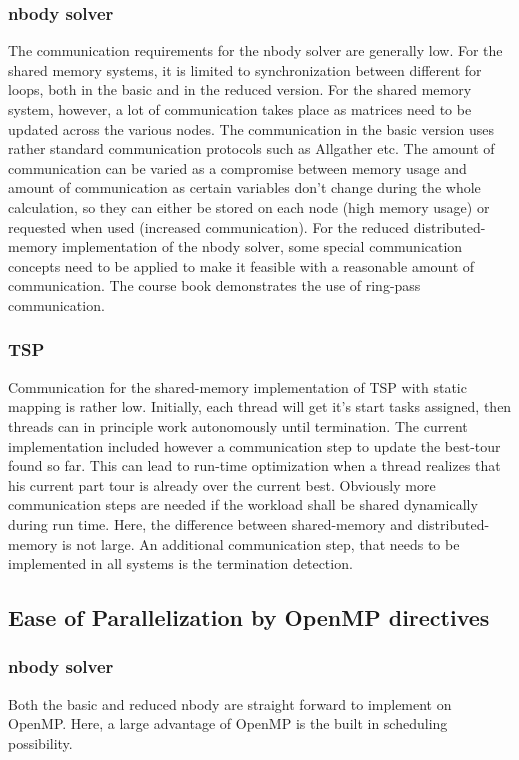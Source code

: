 \documentclass[a4paper,11pt,twoside]{article}
\begin{document}
\subsubsection{nbody solver}
The communication requirements for the nbody solver are generally low. For the shared memory systems, it is limited to synchronization between different for loops, both in the basic and in the reduced version. For the shared memory system, however, a lot of communication takes place as matrices need to be updated across the various nodes. The communication in the basic version uses rather standard communication protocols such as Allgather etc. The amount of communication can be varied as a compromise between memory usage and amount of communication as certain variables don't change during the whole calculation, so they can either be stored on each node (high memory usage) or requested when used (increased communication). For the reduced distributed-memory implementation of the nbody solver, some special communication concepts need to be applied to make it feasible with a reasonable amount of communication. The course book demonstrates the use of ring-pass communication. 

\subsubsection{TSP}
Communication for the shared-memory implementation of TSP with static mapping is rather low. Initially, each thread will get it's start tasks assigned, then threads can in principle work autonomously until termination. The current implementation included however a communication step to update the best-tour found so far. This can lead to run-time optimization when a thread realizes that his current part tour is already over the current best. Obviously more communication steps are needed if the workload shall be shared dynamically during run time. Here, the difference between shared-memory and distributed-memory is not large. An additional communication step, that needs to be implemented in all systems is the termination detection. 

\subsection{Ease of Parallelization by OpenMP directives}
\subsubsection{nbody solver}
Both the basic and reduced nbody are straight forward to implement on OpenMP. Here, a large advantage of OpenMP is the built in scheduling possibility.
\end{document}
